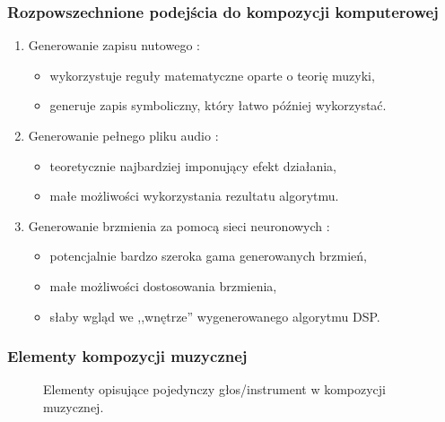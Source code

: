 \documentclass[]{beamer}
\begin{document}
\begin{frame}
  \frametitle{Rozpowszechnione podejścia do kompozycji komputerowej}

  \begin{enumerate}
    \item Generowanie zapisu nutowego \cite{language_models_drummers}:
      \begin{itemize}
        \item wykorzystuje reguły matematyczne oparte o teorię muzyki,
        \item generuje zapis symboliczny, który łatwo później wykorzystać.
      \end{itemize}
    \item Generowanie pełnego pliku audio \cite{riffusion}:
      \begin{itemize}
        \item teoretycznie najbardziej imponujący efekt działania,
        \item małe możliwości wykorzystania rezultatu algorytmu.
      \end{itemize}
    \item Generowanie brzmienia za pomocą sieci neuronowych \cite{nsynth}:
      \begin{itemize}
        \item potencjalnie bardzo szeroka gama generowanych brzmień,
        \item małe możliwości dostosowania brzmienia,
        \item słaby wgląd we ,,wnętrze'' wygenerowanego algorytmu DSP.
      \end{itemize}
  \end{enumerate}
\end{frame}

\begin{frame}
  \frametitle{Elementy kompozycji muzycznej}
  \begin{figure}[H]
    \centering\small
    \begin{center}
    \end{center}
    \caption{
      Elementy opisujące pojedynczy głos/instrument w kompozycji muzycznej. 
    }
    \label{telemetry_backend_asyncio}
  \end{figure}
\end{frame}
\end{document}
